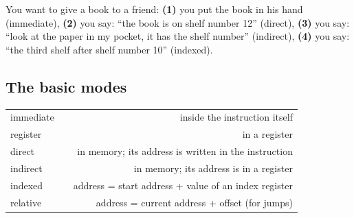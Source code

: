 \begin{tashbih}
    You want to give a book to a friend:
    \textbf{(1)} you put the book in his hand (immediate),
    \textbf{(2)} you say: ``the book is on shelf number 12'' (direct),
    \textbf{(3)} you say: ``look at the paper in my pocket, it has the shelf number'' (indirect),
    \textbf{(4)} you say: ``the third shelf after shelf number 10'' (indexed).
\end{tashbih}

\subsection{The basic modes}
\begin{center}
\small
\begin{tabularx}{\linewidth}{|>{\centering\arraybackslash}p{2.4cm}|>{\centering\arraybackslash}p{3.3cm}|R|}
    \hline
     &  &  \\ \hline
    immediate &  & inside the instruction itself \\ \hline
    register &  & in a register \\ \hline
    direct &  & in memory; its address is written in the instruction \\ \hline
    indirect &  & in memory; its address is in a register \\ \hline
    indexed &  & address = start address + value of an index register \\ \hline
    relative &  & address = current address + offset (for jumps) \\ \hline
\end{tabularx}
\end{center}

